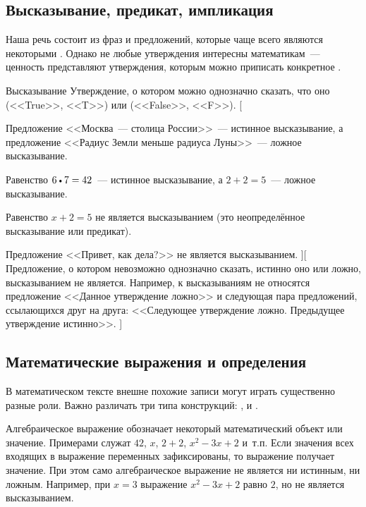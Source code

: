 \subsection{Высказывание, предикат, импликация}

Наша речь состоит из фраз и предложений, которые чаще всего являются некоторыми .
Однако не любые утверждения интересны математикам~--- ценность представляют утверждения, которым можно приписать конкретное .

{Высказывание}{
    Утверждение, о котором можно однозначно сказать, что оно  (<<True>>, <<T>>) или  (<<False>>, <<F>>).
}[
    \item Предложение <<Москва~--- столица России>>~--- истинное высказывание, а предложение <<Радиус Земли меньше радиуса Луны>>~--- ложное высказывание.
    \item Равенство $6 \mul 7 = 42$~--- истинное высказывание, а $2 + 2 = 5$~--- ложное высказывание.
    \item Равенство $x + 2 = 5$ не является высказыванием (это неопределённое высказывание или предикат).
    \item Предложение <<Привет, как дела?>> не является высказыванием.
][
    Предложение, о котором невозможно однозначно сказать, истинно оно или ложно, высказыванием не является.
    Например, к высказываниям не относятся предложение <<Данное утверждение ложно>> и следующая пара предложений, ссылающихся друг на друга: <<Следующее утверждение ложно. Предыдущее утверждение истинно>>.
]


\subsection{Математические выражения и определения}

В математическом тексте внешне похожие записи могут играть существенно разные роли.
Важно различать три типа конструкций: ,  и .

Алгебраическое выражение обозначает некоторый математический объект или значение.
Примерами служат $42$, $x$, $2 + 2$, $x^2 - 3x + 2$ и~т.п.
Если значения всех входящих в выражение переменных зафиксированы, то выражение получает значение.
При этом само алгебраическое выражение не является ни истинным, ни ложным.
Например, при $x = 3$ выражение $x^2 - 3x + 2$ равно $2$, но не является высказыванием.

